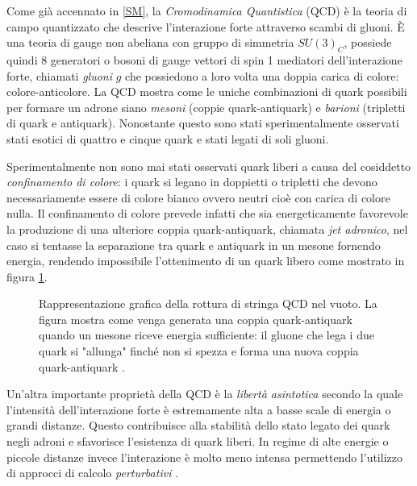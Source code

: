     Come già accennato in \ref{SM}, la \textit{Cromodinamica Quantistica} (QCD) è la teoria di campo quantizzato che descrive l'interazione forte attraverso scambi di gluoni. È una teoria di gauge non abeliana con gruppo di simmetria $SU(3)_C$, possiede quindi 8 generatori o bosoni di gauge vettori di spin 1 mediatori dell'interazione forte, chiamati \textit{gluoni} $g$ che possiedono a loro volta una doppia carica di colore: colore-anticolore. La QCD mostra come le uniche combinazioni di quark possibili per formare un adrone siano \textit{mesoni} (coppie quark-antiquark) e \textit{barioni} (tripletti di quark e antiquark). Nonostante questo sono stati sperimentalmente osservati stati esotici di quattro e cinque quark e stati legati di soli gluoni.

    Sperimentalmente non sono mai stati osservati quark liberi a causa del cosiddetto \textit{confinamento di colore}: i quark si legano in doppietti o tripletti che devono necessariamente essere di colore bianco ovvero neutri cioè con carica di colore nulla. Il confinamento di colore prevede infatti che sia energeticamente favorevole la produzione di una ulteriore coppia quark-antiquark, chiamata \textit{jet adronico}, nel caso si tentasse la separazione tra quark e antiquark in un mesone fornendo energia, rendendo impossibile l'ottenimento di un quark libero come mostrato in figura \ref{fig:2-hadron-jet}.

    \begin{figure}[t]
        \centering
        
        \caption{Rappresentazione grafica della rottura di stringa QCD nel vuoto. La figura mostra come venga generata una coppia quark-antiquark quando un mesone riceve energia sufficiente: il gluone che lega i due quark si "allunga" finché non si spezza e forma una nuova coppia quark-antiquark \cite{Wikimedia_Quark_Confinement}.}
        \label{fig:2-hadron-jet}
    \end{figure}

    Un'altra importante proprietà della QCD è la \textit{libertà asintotica} secondo la quale l'intensità dell'interazione forte è estremamente alta a basse scale di energia o grandi distanze. Questo contribuisce alla stabilità dello stato legato dei quark negli adroni e sfavorisce l'esistenza di quark liberi. In regime di alte energie o piccole distanze invece l'interazione è molto meno intensa permettendo l'utilizzo di approcci di calcolo \textit{perturbativi} \cite{BGS_2012}.

